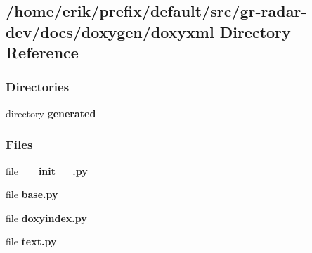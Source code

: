 \subsection{/home/erik/prefix/default/src/gr-\/radar-\/dev/docs/doxygen/doxyxml Directory Reference}
\label{dir_13c14ebe57d12fcd40dc4c2a06c524db}
\subsubsection*{Directories}
\begin{DoxyCompactItemize}
\item 
directory {\bf generated}
\end{DoxyCompactItemize}
\subsubsection*{Files}
\begin{DoxyCompactItemize}
\item 
file {\bf \+\_\+\+\_\+init\+\_\+\+\_\+.\+py}
\item 
file {\bf base.\+py}
\item 
file {\bf doxyindex.\+py}
\item 
file {\bf text.\+py}
\end{DoxyCompactItemize}

